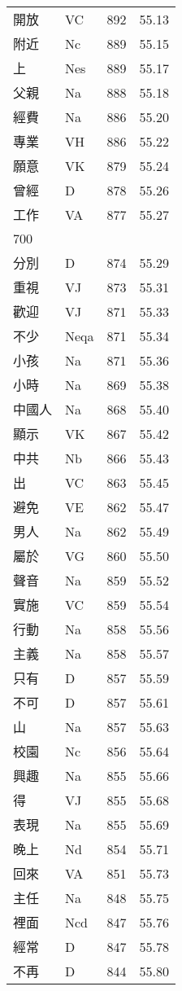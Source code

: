 \documentclass[twocolumn]{book}
\begin{document}
\begin{supertabular}{llrr}
開放 & VC & 892 &  55.13\\
附近 & Nc & 889 &  55.15\\
上 & Nes & 889 &  55.17\\
父親 & Na & 888 &  55.18\\
經費 & Na & 886 &  55.20\\
專業 & VH & 886 &  55.22\\
願意 & VK & 879 &  55.24\\
曾經 & D & 878 &  55.26\\
工作 & VA & 877 &  55.27\\
700\\
分別 & D & 874 &  55.29\\
重視 & VJ & 873 &  55.31\\
歡迎 & VJ & 871 &  55.33\\
不少 & Neqa & 871 &  55.34\\
小孩 & Na & 871 &  55.36\\
小時 & Na & 869 &  55.38\\
中國人 & Na & 868 &  55.40\\
顯示 & VK & 867 &  55.42\\
中共 & Nb & 866 &  55.43\\
出 & VC & 863 &  55.45\\
避免 & VE & 862 &  55.47\\
男人 & Na & 862 &  55.49\\
屬於 & VG & 860 &  55.50\\
聲音 & Na & 859 &  55.52\\
實施 & VC & 859 &  55.54\\
行動 & Na & 858 &  55.56\\
主義 & Na & 858 &  55.57\\
只有 & D & 857 &  55.59\\
不可 & D & 857 &  55.61\\
山 & Na & 857 &  55.63\\
校園 & Nc & 856 &  55.64\\
興趣 & Na & 855 &  55.66\\
得 & VJ & 855 &  55.68\\
表現 & Na & 855 &  55.69\\
晚上 & Nd & 854 &  55.71\\
回來 & VA & 851 &  55.73\\
主任 & Na & 848 &  55.75\\
裡面 & Ncd & 847 &  55.76\\
經常 & D & 847 &  55.78\\
不再 & D & 844 &  55.80\\

\end{supertabular}
\end{document}
